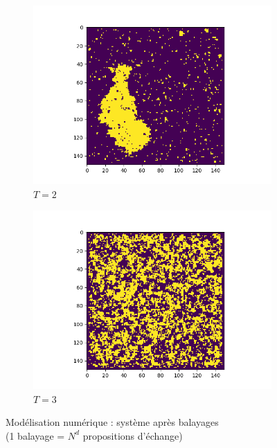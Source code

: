 \documentclass[french]{beamer}
\begin{document}
\begin{frame}
\begin{figure}
	\centering
	\begin{subfigure}{0.5\textwidth}
		\centering
		\includegraphics[height=0.55\textheight]{assets/T2}
		\caption{$T = 2$}
		\label{fig:t2}
	\end{subfigure}%
	\begin{subfigure}{0.5\textwidth}
	\centering
	\includegraphics[height=0.55\textheight]{assets/T3}
	\caption{$T = 3$}
	\label{fig:t3}
\end{subfigure}%
\caption{Modélisation numérique : système après  balayages\\(1 balayage = $N^d$ propositions d'échange)}
\end{figure}

\end{frame}
\end{document}
